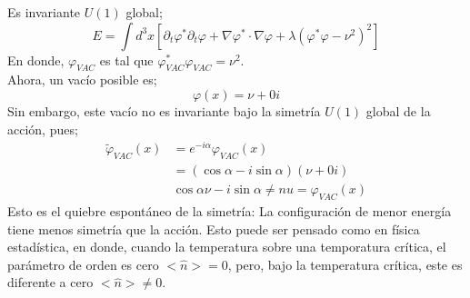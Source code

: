 \documentclass[../main.tex]{subfiles}
\begin{document}
 Es invariante $U(1)$ global;
 \begin{equation}
   E = \int d^3x \left[ \partial_t\varphi^* \partial_t\varphi + \nabla\varphi^* \cdot \nabla \varphi + \lambda \left( \varphi^* \varphi - \nu^2 \right)^2 \right]
  \end{equation}
  En donde, $\varphi_{VAC}$ es tal que $\varphi^*_{VAC}\varphi_{VAC} = \nu^2$. \\
  Ahora, un vacío posible es;
  \begin{equation}
    \varphi(x) = \nu + 0i
   \end{equation}
  Sin embargo, este vacío no es invariante bajo la simetría $U(1)$ global de la acción, pues;
  \begin{align*}
    \tilde{\varphi}_{VAC}(x) & = e^{-i\alpha}\varphi_{VAC}(x) \\
    & = \left( \cos{\alpha} - i\sin{\alpha} \right) \left( \nu+0i \right) \\
    & \cos{\alpha} \nu - i\sin{\alpha} \neq nu = \varphi_{VAC}(x)
  \end{align*}
  Esto es el quiebre espontáneo de la simetría: La configuración de menor energía tiene menos simetría que la acción. Esto puede ser pensado como en física estadística, en donde, cuando la temperatura sobre una temporatura crítica, el parámetro de orden es cero $<\hat{n}>=0$, pero, bajo la temperatura crítica, este es diferente a cero $<\hat{n}>\neq 0$. \\
\end{document}
